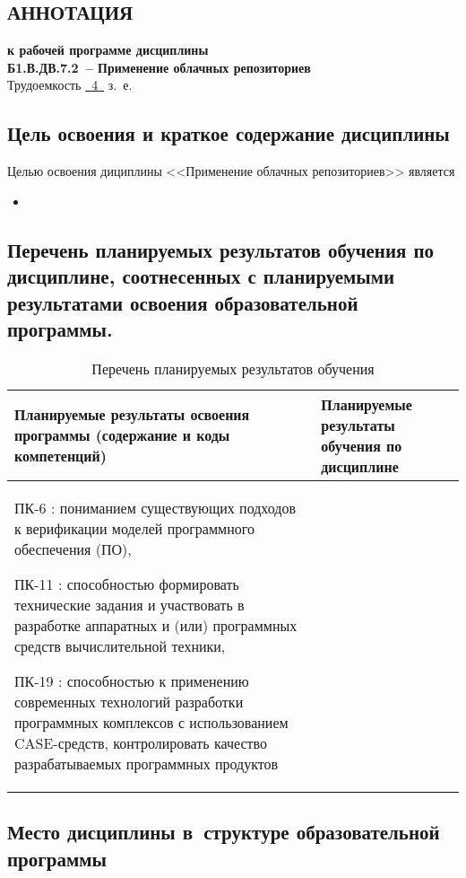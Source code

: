 \documentclass[a4paper,12pt]{article}
\begin{document}
\newpage


\begin{center}
\section{АННОТАЦИЯ}
{\bf к рабочей программе дисциплины\\
Б1.В.ДВ.7.2\ -- Применение облачных репозиториев} \\
Трудоемкость \uline{~4~} з.~е.
\end{center}


\subsection{Цель освоения и краткое содержание дисциплины}
Целью освоения дициплины <<Применение облачных репозиториев>> является 
\begin{itemize}
  \item
  
\end{itemize}


\subsection{Перечень планируемых результатов обучения по дисциплине, соотнесенных с планируемыми результатами освоения образовательной программы.}
\begin{longtable}{|p{8cm}|p{8cm}|}
\caption{Перечень планируемых результатов обучения}\\
\hline
\centering
Планируемые результаты освоения программы (содержание и коды компетенций) & 
\centering\arraybackslash
Планируемые результаты обучения по дисциплине
\\
\hline

ПК-6 : пониманием существующих подходов к верификации моделей программного обеспечения (ПО), 

ПК-11 : способностью формировать технические задания и участвовать в разработке аппаратных и (или) программных средств вычислительной техники, 

ПК-19 : способностью к применению современных технологий разработки программных комплексов с использованием CASE-средств, контролировать качество разрабатываемых программных продуктов

& \\
\hline
\end{longtable}


\subsection{Место дисциплины в~структуре образовательной программы}
\end{document}
